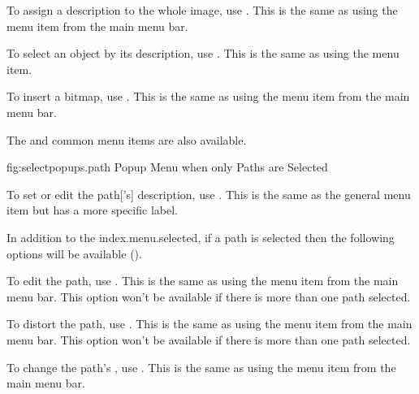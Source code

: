 To assign a description to the whole image, use
. This is the same as using the
 menu item from the main menu bar.


To select an \gls{object} by its description, use
. This is the same as using the
 menu item.


To insert a \gls{bitmap}, use . This
is the same as using the  menu item from the main menu bar.

The  and  common menu
items are also available.



\FloatFig
  {fig:selectpopups.path}
  {}
  {Popup Menu when only Paths are Selected}


To set or edit the \gls{path}['s] description, use
. This is the same as
the general  menu item but has a more specific label.

In addition to the \gls{index.menu.selected},
if a path is selected then the following options will be available
().


To edit the path, use . This is the same as using
the  menu item from the main menu bar.
This option won't be available if there is more than one
path selected.


To distort the path, use . This is the same as using
the  menu item from the main menu bar.
This option won't be available if there is more than one
path selected.


To change the path's , use
. This is the same as using the
 menu item from the main menu bar.

